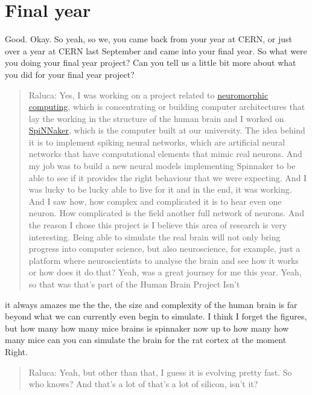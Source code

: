 \documentclass[
]{book}
\begin{document}
\hypertarget{final-year}{%
\section{Final year}\label{final-year}}

Good. Okay. So yeah, so we, you came back from your year at CERN, or just over a year at CERN last September and came into your final year. So what were you doing your final year project? Can you tell us a little bit more about what you did for your final year project?

\begin{quote}
Raluca: Yes, I was working on a project related to \href{https://en.wikipedia.org/wiki/Neuromorphic_engineering}{neuromorphic computing}, which is concentrating or building computer architectures that lay the working in the structure of the human brain and I worked on \href{https://en.wikipedia.org/wiki/SpiNNaker}{SpiNNaker}, which is the computer built at our university. The idea behind it is to implement spiking neural networks, which are artificial neural networks that have computational elements that mimic real neurons. And my job was to build a new neural models implementing Spinnaker to be able to see if it provides the right behaviour that we were expecting. And I was lucky to be lucky able to live for it and in the end, it was working. And I saw how, how complex and complicated it is to hear even one neuron. How complicated is the field another full network of neurons. And the reason I chose this project is I believe this area of research is very interesting. Being able to simulate the real brain will not only bring progress into computer science, but also neuroscience, for example, just a platform where neuroscientists to analyse the brain and see how it works or how does it do that? Yeah, was a great journey for me this year. Yeah, so that was that's part of the Human Brain Project Isn't
\end{quote}

it always amazes me the the, the size and complexity of the human brain is far beyond what we can currently even begin to simulate. I think I forget the figures, but how many how many mice brains is spinnaker now up to how many how many mice can you can simulate the brain for the rat cortex at the moment Right.

\begin{quote}
Raluca: Yeah, but other than that, I guess it is evolving pretty fast. So who knows? And that's a lot of that's a lot of silicon, isn't it?
\end{quote}
\end{document}
